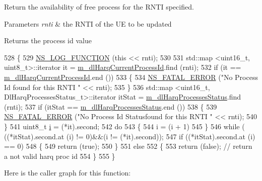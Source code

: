 Return the availability of free process for the R\+N\+TI specified. 


\begin{DoxyParams}{Parameters}
{\em rnti} & the R\+N\+TI of the UE to be updated \\
\hline
\end{DoxyParams}
\begin{DoxyReturn}{Returns}
the process id value 
\end{DoxyReturn}

\begin{DoxyCode}
528 \{
529   \hyperlink{log-macros-disabled_8h_a90b90d5bad1f39cb1b64923ea94c0761}{NS\_LOG\_FUNCTION} (\textcolor{keyword}{this} << rnti);
530 
531   std::map <uint16\_t, uint8\_t>::iterator it = \hyperlink{classns3_1_1FdMtFfMacScheduler_a3fd5f196843786972640bc9fe454e73f}{m\_dlHarqCurrentProcessId}.find (rnti);
532   \textcolor{keywordflow}{if} (it == \hyperlink{classns3_1_1FdMtFfMacScheduler_a3fd5f196843786972640bc9fe454e73f}{m\_dlHarqCurrentProcessId}.end ())
533     \{
534       \hyperlink{group__fatal_ga5131d5e3f75d7d4cbfd706ac456fdc85}{NS\_FATAL\_ERROR} (\textcolor{stringliteral}{"No Process Id found for this RNTI "} << rnti);
535     \}
536   std::map <uint16\_t, DlHarqProcessesStatus\_t>::iterator itStat = 
      \hyperlink{classns3_1_1FdMtFfMacScheduler_a9da9ca73b704b7386f3b751274e1f3e5}{m\_dlHarqProcessesStatus}.find (rnti);
537   \textcolor{keywordflow}{if} (itStat == \hyperlink{classns3_1_1FdMtFfMacScheduler_a9da9ca73b704b7386f3b751274e1f3e5}{m\_dlHarqProcessesStatus}.end ())
538     \{
539       \hyperlink{group__fatal_ga5131d5e3f75d7d4cbfd706ac456fdc85}{NS\_FATAL\_ERROR} (\textcolor{stringliteral}{"No Process Id Statusfound for this RNTI "} << rnti);
540     \}
541   uint8\_t \hyperlink{bernuolliDistribution_8m_a6f6ccfcf58b31cb6412107d9d5281426}{i} = (*it).second;
542   \textcolor{keywordflow}{do}
543     \{
544       i = (i + 1) %
545     \}
546   \textcolor{keywordflow}{while} ( ((*itStat).second.at (i) != 0)&&(i != (*it).second));
547   \textcolor{keywordflow}{if} ((*itStat).second.at (i) == 0)
548     \{
549       \textcolor{keywordflow}{return} (\textcolor{keyword}{true});
550     \}
551   \textcolor{keywordflow}{else}
552     \{
553       \textcolor{keywordflow}{return} (\textcolor{keyword}{false}); \textcolor{comment}{// return a not valid harq proc id}
554     \}
555 \}
\end{DoxyCode}


Here is the caller graph for this function\+:


